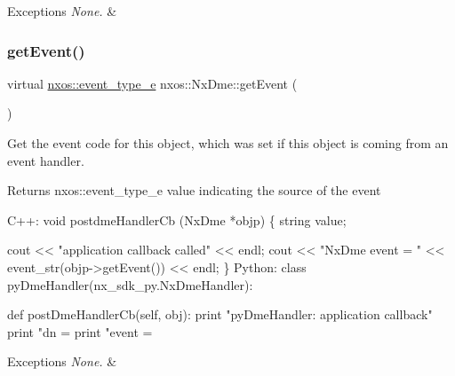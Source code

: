 \begin{DoxyExceptions}{Exceptions}
{\em None.} & \\
\hline
\end{DoxyExceptions}
\mbox{\label{classnxos_1_1_nx_dme_aff302a3891e0b6f69e9e0fd26e6e16a7}} 
\subsubsection{\texorpdfstring{get\+Event()}{getEvent()}}
{\footnotesize\ttfamily virtual \mbox{\hyperlink{nx__common_8h_af9a9040b7681199d386e94eb888018cb}{nxos\+::event\+\_\+type\+\_\+e}} nxos\+::\+Nx\+Dme\+::get\+Event (\begin{DoxyParamCaption}{ }\end{DoxyParamCaption})\hspace{0.3cm}{\ttfamily [pure virtual]}}

Get the event code for this object, which was set if this object is coming from an event handler.

\begin{DoxyReturn}{Returns}
nxos\+::event\+\_\+type\+\_\+e value indicating the source of the event 
\begin{DoxyCode}
C++:
   \textcolor{keywordtype}{void} postdmeHandlerCb (NxDme *objp)
   \{
       \textcolor{keywordtype}{string} value;

       cout << \textcolor{stringliteral}{"application callback called"} << endl;
       cout << \textcolor{stringliteral}{"NxDme event = "} << event\_str(objp->getEvent()) << endl;
   \}
Python:
   \textcolor{keyword}{class }pyDmeHandler(nx\_sdk\_py.NxDmeHandler):

       def postDmeHandlerCb(self, obj):
           print "pyDmeHandler: application callback"
           print "dn = %
           print "event = %
\end{DoxyCode}

\end{DoxyReturn}

\begin{DoxyExceptions}{Exceptions}
{\em None.} & \\
\hline
\end{DoxyExceptions}
\mbox{\label{classnxos_1_1_nx_dme_a537141d11543c8e5c9e82b53255981cb}} 
